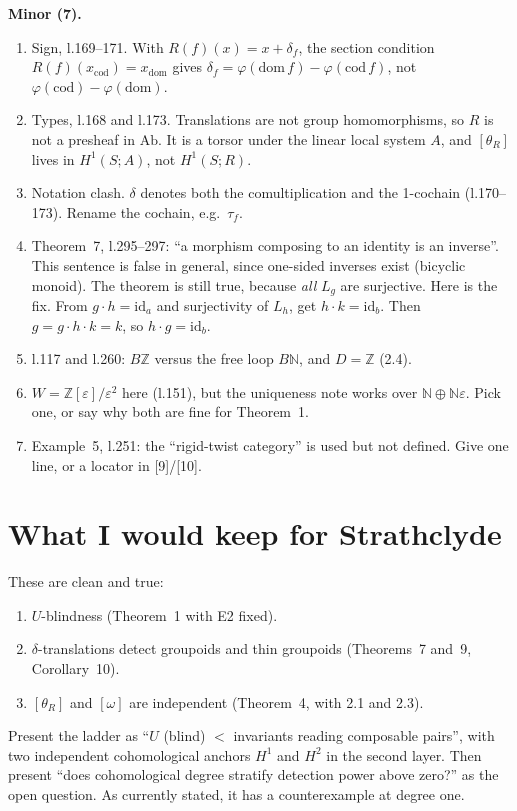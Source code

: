 \documentclass[11pt]{article}
\newcommand{\Z}{\mathbb{Z}}
\newcommand{\N}{\mathbb{N}}
\begin{document}
\textbf{Minor (7).}
\begin{enumerate}[label=\textbf{M\arabic*.},leftmargin=*]
\item Sign, l.169--171. With $R(f)(x)=x+\delta_f$, the section condition $R(f)(x_{\mathrm{cod}})=
x_{\mathrm{dom}}$ gives $\delta_f=\varphi(\mathrm{dom}\,f)-\varphi(\mathrm{cod}\,f)$, not
$\varphi(\mathrm{cod})-\varphi(\mathrm{dom})$.
\item Types, l.168 and l.173. Translations are not group homomorphisms, so $R$ is not a presheaf in
$\mathrm{Ab}$. It is a torsor under the linear local system $A$, and $[\theta_R]$ lives in
$H^1(S;A)$, not $H^1(S;R)$.
\item Notation clash. $\delta$ denotes both the comultiplication and the 1-cochain (l.170--173).
Rename the cochain, e.g.\ $\tau_f$.
\item Theorem~7, l.295--297: ``a morphism composing to an identity is an inverse''. This sentence
is false in general, since one-sided inverses exist (bicyclic monoid). The theorem is still true,
because \emph{all} $L_g$ are surjective. Here is the fix. From $g\cdot h=\mathrm{id}_a$ and
surjectivity of $L_h$, get $h\cdot k=\mathrm{id}_b$. Then $g=g\cdot h\cdot k=k$, so $h\cdot
g=\mathrm{id}_b$.
\item l.117 and l.260: $B\Z$ versus the free loop $B\N$, and $D=\Z$ (2.4).
\item $W=\Z[\varepsilon]/\varepsilon^2$ here (l.151), but the uniqueness note works over
$\N\oplus\N\varepsilon$. Pick one, or say why both are fine for Theorem~1.
\item Example~5, l.251: the ``rigid-twist category'' is used but not defined. Give one line, or a
locator in [9]/[10].
\end{enumerate}

\section*{What I would keep for Strathclyde}
These are clean and true:
\begin{enumerate}[leftmargin=*]
\item $U$-blindness (Theorem~1 with E2 fixed).
\item $\delta$-translations detect groupoids and thin groupoids (Theorems~7 and~9, Corollary~10).
\item $[\theta_R]$ and $[\omega]$ are independent (Theorem~4, with 2.1 and 2.3).
\end{enumerate}
Present the ladder as ``$U$ (blind) $<$ invariants reading composable pairs'', with two
independent cohomological anchors $H^1$ and $H^2$ in the second layer. Then present ``does
cohomological degree stratify detection power above zero?'' as the open question. As currently
stated, it has a counterexample at degree one.
\end{document}
